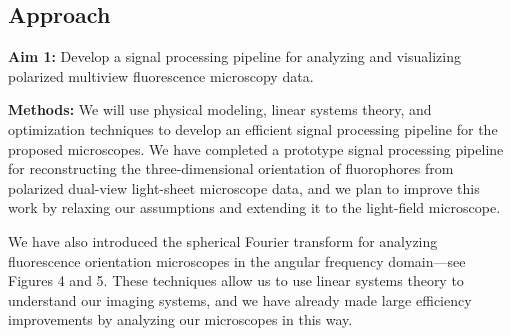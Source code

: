 \documentclass[12pt]{article}
\begin{document}
\subsection*{Approach}
\noindent\textbf{Aim 1:} Develop a signal processing pipeline for analyzing and
  visualizing polarized multiview fluorescence microscopy data.

  \noindent\textbf{Methods:} We will use physical modeling, linear systems
  theory, and optimization techniques to develop an efficient signal processing
  pipeline for the proposed microscopes. We have completed a prototype signal
  processing pipeline for reconstructing the three-dimensional orientation of
  fluorophores from polarized dual-view light-sheet microscope data, and we plan
  to improve this work by relaxing our assumptions and extending it to the
  light-field microscope.

  We have also introduced the spherical Fourier transform for analyzing
  fluorescence orientation microscopes in the angular frequency domain---see
  Figures 4 and 5. These techniques allow us to use linear systems theory to
  understand our imaging systems, and we have already made large efficiency
  improvements by analyzing our microscopes in this way.
  
\end{document}
